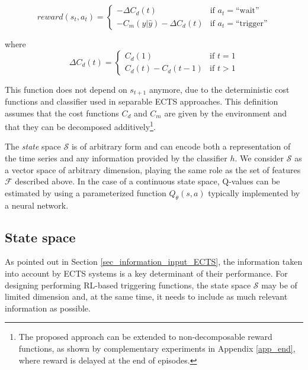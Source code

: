 \documentclass[sigconf, nonacm, table]{acmart}
\begin{document}
\begin{equation}
        reward(s_t, a_t) = \left\{
    \begin{array}{ll}
         -\Delta C_d(t) & \mbox{if } a_t=\text{``wait''} \\  
         -C_m(y|\hat{y}) - \Delta C_d(t) & \mbox{if } a_t=\text{``trigger''}
    \end{array}
    \right.
    \label{eq:grad_reward}
\end{equation}


where 
\begin{equation}
    \Delta C_d(t) = \left\{
    \begin{array}{ll}
         C_d(1) & \mbox{if } t=1 \\  
         C_d(t) - C_d(t-1) & \mbox{if } t>1
    \end{array}
    \right.
\end{equation}

This function does not depend on $s_{t+1}$ anymore, due to the deterministic cost functions and classifier used in separable ECTS approaches. This definition assumes that the cost functions $C_d$ and $C_m$ are given by the environment and that they can be decomposed additively\footnote{The proposed approach can be extended to non-decomposable reward functions, as shown by complementary experiments in Appendix \ref{app_end}, where reward is delayed at the end of episodes.}.

     
The \textit{state} space $\mathcal{S}$ is of arbitrary form and can encode both a representation of the time series and any information provided by the classifier $h$. We consider $\mathcal{S}$ as a vector space of arbitrary dimension, playing the same role as the set of features $\mathcal{F}$ described above. In the case of a continuous state space, Q-values can be estimated by using a parameterized function $Q_\theta(s, a)$ typically implemented by a neural network.

\subsection{State space} 
\label{state_space}

As pointed out in Section \ref{sec_information_input_ECTS}, the information taken into account by ECTS systems is a key determinant of their performance. 
For designing performing RL-based triggering functions, the state space $\mathcal{S}$ may be of limited dimension and, at the same time, it needs to include as much relevant information as possible. 
\end{document}
